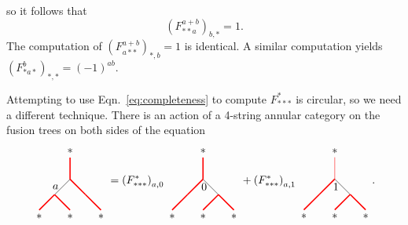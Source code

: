 so it follows that 
	\begin{equation}
		\left(F_{**a}^{a+b}\right)_{b,*}=1.
	\end{equation}
The computation of $\left(F_{a**}^{a+b}\right)_{*,b}=1$ is identical. A similar computation yields $\left(F_{*a*}^{b}\right)_{*,*}=(-1)^{ab}$.

Attempting to use Eqn.~\ref{eq:completeness} to compute $F_{***}^*$ is circular, so we need a different technique. There is an action of a 4-string annular category on the fusion trees on both sides of the equation
\begin{equation}
\begin{tikzpicture}[scale=0.7,baseline=(current bounding box.center)]
\draw[red,line width=0.4mm] (0,0) -- (0,1) node[pos=1,above,text=black]{$*$};
\draw[] (0,0) -- (-0.707107,-0.707107) node [pos=.5,left] {$a$};
\draw[red,line width=0.4mm] (-0.707107,-0.707107) -- (-1.41421,-1.41421);
\draw[red,line width=0.4mm] (-0.707107,-0.707107) -- (0,-1.41421);
\draw[red,line width=0.4mm] (0,0) -- (0.707107,-0.707107);
\draw[red,line width=0.4mm] (0.707107,-0.707107) -- (1.41421,-1.41421);
\node at (-1.41421,-1.7) {$*$};
\node at (0,-1.7) {$*$};
\node at (1.41421,-1.7) {$*$};
\end{tikzpicture}
=
\left(F_{***}^*\right)_{a,0}
\begin{tikzpicture}[xscale=-1,scale=0.7,baseline=(current bounding box.center)]
\draw[red,line width=0.4mm] (0,0) -- (0,1) node[pos=1,above,text=black]{$*$};
\draw[] (0,0) -- (-0.707107,-0.707107) node [pos=.5,left] {$0$};
\draw[red,line width=0.4mm] (-0.707107,-0.707107) -- (-1.41421,-1.41421);
\draw[red,line width=0.4mm] (-0.707107,-0.707107) -- (0,-1.41421);
\draw[red,line width=0.4mm] (0,0) -- (0.707107,-0.707107);
\draw[red,line width=0.4mm] (0.707107,-0.707107) -- (1.41421,-1.41421);
\node at (-1.41421,-1.7) {$*$};
\node at (0,-1.7) {$*$};
\node at (1.41421,-1.7) {$*$};
\end{tikzpicture}
+
\left(F_{***}^*\right)_{a,1}
\begin{tikzpicture}[xscale=-1,scale=0.7,baseline=(current bounding box.center)]
\draw[red] (0,0) -- (0,1) node[pos=1,above,text=black]{$*$};
\draw[] (0,0) -- (-0.707107,-0.707107) node [pos=.5,left] {$1$};
\draw[red,line width=0.4mm] (-0.707107,-0.707107) -- (-1.41421,-1.41421);
\draw[red,line width=0.4mm] (-0.707107,-0.707107) -- (0,-1.41421);
\draw[red,line width=0.4mm] (0,0) -- (0.707107,-0.707107);
\draw[red,line width=0.4mm] (0.707107,-0.707107) -- (1.41421,-1.41421);
\node at (-1.41421,-1.7) {$*$};
\node at (0,-1.7) {$*$};
\node at (1.41421,-1.7) {$*$};
\end{tikzpicture}.
\end{equation}
